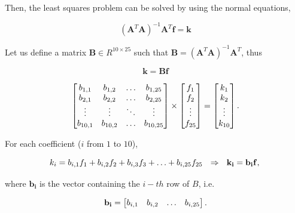 \documentclass{ipol}
\numberwithin{equation}{section}
\numberwithin{table}{section}
\begin{document}
Then, the least squares problem can be solved by using the normal equations,

\begin{equation*}
	(\mathbf{A}^T\mathbf{A})^{-1}\mathbf{A}^T\mathbf{f} = \mathbf{k} 
\end{equation*}

Let us define a matrix $\mathbf{B} \in R^{10\times25}$ such that $\mathbf{B}=(\mathbf{A}^T\mathbf{A})^{-1}\mathbf{A}^T$, thus

$$ \mathbf{k} = \mathbf{B}\mathbf{f} $$

\begin{equation*}
	\begin{bmatrix}
		b_{1,1}		& b_{1,2}	& \hdots	& b_{1,25}	\\
		b_{2,1}		& b_{2,2}	& \hdots	& b_{2,25}	\\
		\vdots		& \vdots	& \ddots	& \vdots	\\
		b_{10,1}	& b_{10,2}	& \hdots	& b_{10,25}
	\end{bmatrix}
	\times
	\begin{bmatrix}
		f_1		\\
		f_2		\\
		\vdots	\\
		f_{25}
	\end{bmatrix}
	=
	\begin{bmatrix}
		k_1		\\
		k_2		\\
		\vdots	\\
		k_{10}
	\end{bmatrix} .\\
\end{equation*}

For each coefficient ($i$ from $1$ to $10$), 

\begin{equation}
	\label{eq:coefficients}
	k_i = b_{i,1}f_1 + b_{i,2}f_2 + b_{i,3}f_3 + \hdots + b_{i,25}f_{25} \ \ \Rightarrow \ \ \mathbf{k_i} = \mathbf{b_i}\mathbf{f} ,\\
\end{equation}

where $\mathbf{b_i}$ is the vector containing the $i-th$ row of $B$, i.e.

\begin{equation}
	\label{eq:b_i_v}
	\mathbf{b_i} = \begin{bmatrix}	b_{i,1}		& b_{i,2}	& \hdots	& b_{i,25}
					\end{bmatrix}.\\
\end{equation}
\end{document}
